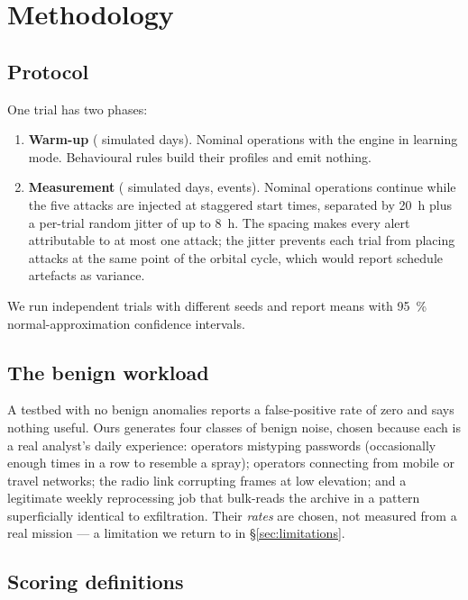 \section{Methodology}
\label{sec:methodology}

\subsection{Protocol}

One trial has two phases:

\begin{enumerate}
\item \textbf{Warm-up} (\ResWarmupDays{} simulated days). Nominal operations with
the engine in learning mode. Behavioural rules build their profiles and emit
nothing.
\item \textbf{Measurement} (\ResMeasureDays{} simulated days,
\ResEventsPerWindow{} events). Nominal operations continue while the five attacks
are injected at staggered start times, separated by \SI{20}{\hour} plus a
per-trial random jitter of up to \SI{8}{\hour}. The spacing makes every alert
attributable to at most one attack; the jitter prevents each trial from placing
attacks at the same point of the orbital cycle, which would report schedule
artefacts as variance.
\end{enumerate}

We run \ResTrials{} independent trials with different seeds and report means with
\SI{95}{\percent} normal-approximation confidence intervals.

\subsection{The benign workload}

A testbed with no benign anomalies reports a false-positive rate of zero and says
nothing useful. Ours generates four classes of benign noise, chosen because each
is a real analyst's daily experience: operators mistyping passwords (occasionally
enough times in a row to resemble a spray); operators connecting from mobile or
travel networks; the radio link corrupting frames at low elevation; and a
legitimate weekly reprocessing job that bulk-reads the archive in a pattern
superficially identical to exfiltration. Their \emph{rates} are chosen, not
measured from a real mission --- a limitation we return to in
\S\ref{sec:limitations}.

\subsection{Scoring definitions}

